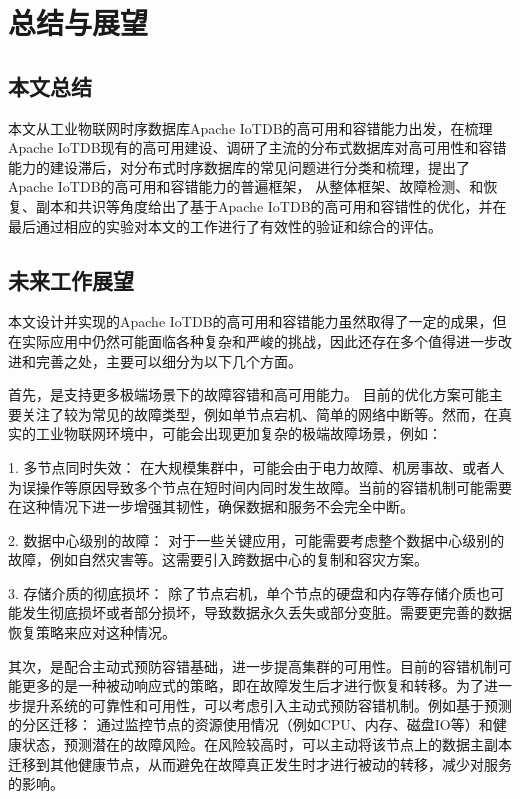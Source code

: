 
\chapter{总结与展望}


\section{本文总结}

本文从工业物联网时序数据库Apache IoTDB的高可用和容错能力出发，在梳理Apache IoTDB现有的高可用建设、调研了主流的分布式数据库对高可用性和容错能力的建设滞后，对分布式时序数据库的常见问题进行分类和梳理，提出了Apache IoTDB的高可用和容错能力的普遍框架，
从整体框架、故障检测、\failover 和恢复、副本和共识等角度给出了基于Apache IoTDB的高可用和容错性的优化，并在最后通过相应的实验对本文的工作进行了有效性的验证和综合的评估。


\section{未来工作展望}

本文设计并实现的Apache IoTDB的高可用和容错能力虽然取得了一定的成果，但在实际应用中仍然可能面临各种复杂和严峻的挑战，因此还存在多个值得进一步改进和完善之处，主要可以细分为以下几个方面。

首先，是支持更多极端场景下的故障容错和高可用能力。 目前的优化方案可能主要关注了较为常见的故障类型，例如单节点宕机、简单的网络中断等。然而，在真实的工业物联网环境中，可能会出现更加复杂的极端故障场景，例如：

1. 多节点同时失效： 在大规模集群中，可能会由于电力故障、机房事故、或者人为误操作等原因导致多个节点在短时间内同时发生故障。当前的容错机制可能需要在这种情况下进一步增强其韧性，确保数据和服务不会完全中断。

2. 数据中心级别的故障： 对于一些关键应用，可能需要考虑整个数据中心级别的故障，例如自然灾害等。这需要引入跨数据中心的复制和容灾方案。

3. 存储介质的彻底损坏： 除了节点宕机，单个节点的硬盘和内存等存储介质也可能发生彻底损坏或者部分损坏，导致数据永久丢失或部分变脏。需要更完善的数据恢复策略来应对这种情况。

其次，是配合主动式预防容错基础，进一步提高集群的可用性。目前的容错机制可能更多的是一种被动响应式的策略，即在故障发生后才进行恢复和转移。为了进一步提升系统的可靠性和可用性，可以考虑引入主动式预防容错机制。例如基于预测的分区迁移： 通过监控节点的资源使用情况（例如CPU、内存、磁盘IO等）和健康状态，预测潜在的故障风险。在风险较高时，可以主动将该节点上的数据主副本迁移到其他健康节点，从而避免在故障真正发生时才进行被动的转移，减少对服务的影响。

